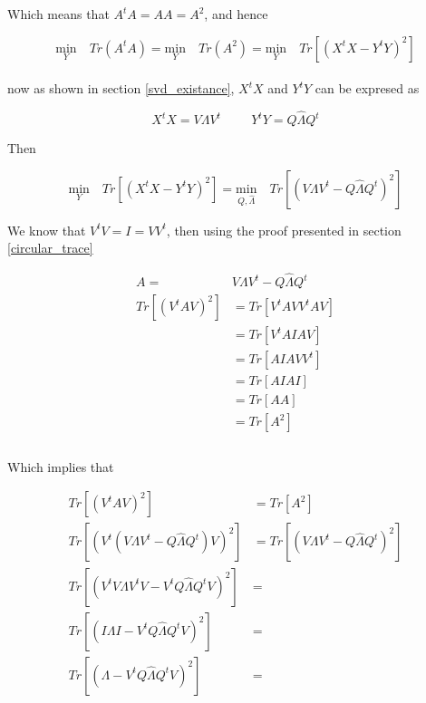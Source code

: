\documentclass{article}
\begin{document}
    Which means that $A^tA = AA = A^2$, and hence

    \begin{equation*}
        \underset{Y}{\text{min}} \quad Tr(A^tA)
        =
        \underset{Y}{\text{min}} \quad Tr(A^2)
        =
        \underset{Y}{\text{min}} \quad Tr[(X^tX - Y^tY)^2]
    \end{equation*}\\

    now as shown in section \ref{svd_existance}, $X^tX$ and $Y^tY$ can be
    expresed as

    \begin{equation*}
        X^tX = V\Lambda V^t \hspace{1cm} Y^tY = Q \hat{\Lambda} Q^t
    \end{equation*}

    Then

    \begin{equation*}
        \underset{Y}{\text{min}} \quad Tr[(X^tX - Y^tY)^2]
        =
        \underset{Q,\hat{\Lambda}}{\text{min}} \quad Tr[(V\Lambda V^t - Q \hat{\Lambda} Q^t)^2]
    \end{equation*}

    We know that $V^tV = I = VV^t$, then using the proof presented in section \ref{circular_trace}

    \begin{equation*}
        \begin{aligned}
            A =& V\Lambda V^t - Q \hat{\Lambda} Q^t\\
            Tr[(V^tAV)^2] &= Tr[V^tAVV^tAV]\\
                          &= Tr[V^tAIAV]\\
                          &= Tr[AIAVV^t]\\
                          &= Tr[AIAI]\\
                          &= Tr[AA]\\
                          &= Tr[A^2]\\
        \end{aligned}
    \end{equation*}\\

    Which implies that

    \begin{equation*}
        \begin{aligned}
            Tr[(V^tAV)^2] &= Tr[A^2]\\
            Tr[(V^t(V\Lambda V^t - Q \hat{\Lambda} Q^t)V)^2] &= Tr[(V\Lambda V^t - Q \hat{\Lambda} Q^t)^2]\\
            Tr[(V^tV\Lambda V^tV - V^tQ \hat{\Lambda} Q^tV)^2] &=\\
            Tr[(I\Lambda I - V^tQ \hat{\Lambda} Q^tV)^2] &=\\
            Tr[(\Lambda - V^tQ \hat{\Lambda} Q^tV)^2] &=\\
        \end{aligned}
    \end{equation*}
\end{document}
